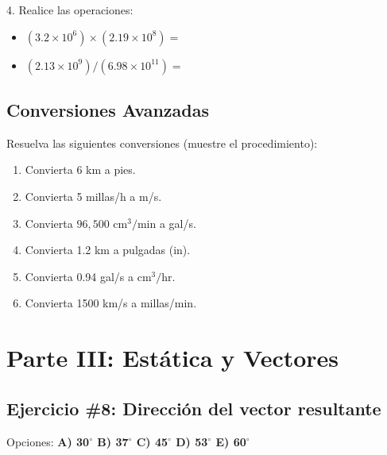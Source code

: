 \documentclass[a4paper,12pt]{article}
\begin{document}
4. Realice las operaciones:
\begin{itemize}
    \item $(3.2 \times 10^6) \times (2.19 \times 10^8) =$ \underline{\hspace{4cm}}
    \item $(2.13 \times 10^9) / (6.98 \times 10^{11}) =$ \underline{\hspace{4cm}}
\end{itemize}

\subsection{Conversiones Avanzadas}
Resuelva las siguientes conversiones (muestre el procedimiento):
\begin{enumerate}
    \item Convierta 6 km a pies.
    \item Convierta 5 millas/h a m/s.
    \item Convierta $96,500 \text{ cm}^3/\text{min}$ a gal/s.
    \item Convierta 1.2 km a pulgadas (in).
    \item Convierta 0.94 gal/s a $\text{cm}^3/\text{hr}$.
    \item Convierta 1500 km/s a millas/min.
\end{enumerate}

\newpage

\section{Parte III: Estática y Vectores}

\subsection{Ejercicio \#8: Dirección del vector resultante}
\begin{center}
\end{center}
Opciones: \textbf{A) 30$^\circ$ \quad B) 37$^\circ$ \quad C) 45$^\circ$ \quad D) 53$^\circ$ \quad E) 60$^\circ$}
\end{document}
